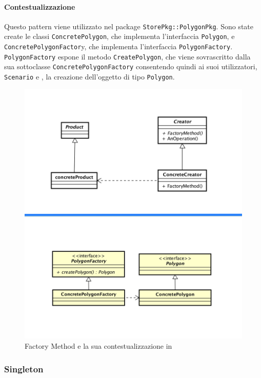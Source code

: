 \paragraph{Contestualizzazione}
Questo pattern viene utilizzato nel package \texttt{StorePkg::PolygonPkg}. Sono state create le classi \texttt{ConcretePolygon}, che implementa l'interfaccia \texttt{Polygon}, e \texttt{ConcretePolygonFactor}y, che implementa l'interfaccia \texttt{PolygonFactory}. \texttt{PolygonFactory} espone il metodo \texttt{CreatePolygon}, che viene sovrascritto dalla sua sottoclasse \texttt{ConcretePolygonFactory} consentendo quindi ai suoi utilizzatori, \texttt{Scenario} e \texttt{}, la creazione dell'oggetto di tipo \texttt{Polygon}.
	\begin{figure}[H]
		\label{builder_compara}
		\centering
		\includegraphics[scale=0.14]{img/factoryComparati.png}
		\caption{Factory Method e la sua contestualizzazione in \progetto}
	\end{figure}


\newpage
\subsubsection{Singleton}
